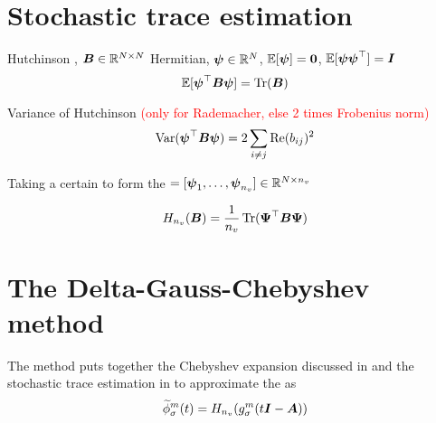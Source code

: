 
\section{Stochastic trace estimation}
\label{sec:2-chebyshev-stochastic-trace-estimation}

Hutchinson \cite{hutchinson1990trace}, $\boldsymbol{B} \in \mathbb{R}^{N \times N}$ Hermitian,
$\boldsymbol{\psi} \in \mathbb{R}^N$, $\mathbb{E}[\boldsymbol{\psi}] = \boldsymbol{0}$, $\mathbb{E}[\boldsymbol{\psi}\boldsymbol{\psi}^{\top}] = \boldsymbol{I}$ 
\begin{equation}
    \mathbb{E}[\boldsymbol{\psi}^{\top} \boldsymbol{B} \boldsymbol{\psi}] = \operatorname{Tr}(\boldsymbol{B})
    \label{equ:2-chebyshev-DGC-hutchinson}
\end{equation}

Variance of Hutchinson \cite[Proposition~1]{hutchinson1990trace} \textcolor{red}{(only for Rademacher, else 2 times Frobenius norm)}
\begin{equation}
    \operatorname{Var}(\boldsymbol{\psi}^{\top} \boldsymbol{B} \boldsymbol{\psi}) = 2 \sum_{i \neq j} \operatorname{Re}(b_{ij})^2
    \label{equ:2-chebyshev-DGC-hutchinson-variance}
\end{equation}

Taking a certain  to form the
 $= [\boldsymbol{\psi}_1, \dots, \boldsymbol{\psi}_{n_v}] \in \mathbb{R}^{N \times n_v}$

\begin{equation}
    H_{n_v}(\boldsymbol{B}) = \frac{1}{n_v} \operatorname{Tr}(\boldsymbol{\Psi}^{\top} \boldsymbol{B} \boldsymbol{\Psi})
    \label{equ:2-chebyshev-DGC-hutchionson-estimator}
\end{equation}


\section{The Delta-Gauss-Chebyshev method}
\label{sec:2-chebyshev-delta-gauss-chebyshev}

The  method \cite[Algorithm~2]{lin2017randomized} puts together the 
Chebyshev expansion discussed in  and 
the stochastic trace estimation in 
to approximate the  as
\begin{equation}
    \widetilde{\phi}_{\sigma}^m(t) = H_{n_v}(g_{\sigma}^m(t\boldsymbol{I} - \boldsymbol{A}))
    \label{equ:2-chebyshev-DGC-final-estimator}
\end{equation}

